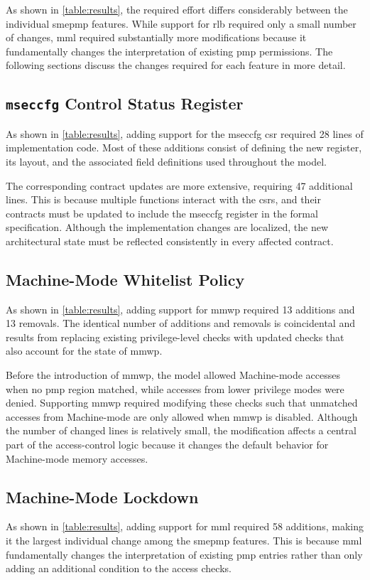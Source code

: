 As shown in \cref{table:results}, the required effort differs considerably between the individual \gls{smepmp} features.
While support for \gls{rlb} required only a small number of changes, \gls{mml} required substantially more modifications because it fundamentally changes the interpretation of existing \gls{pmp} permissions.
The following sections discuss the changes required for each feature in more detail.

\subsection{\texttt{mseccfg} Control Status Register}
As shown in \cref{table:results}, adding support for the mseccfg \gls{csr} required 28 lines of implementation code.
Most of these additions consist of defining the new register, its layout, and the associated field definitions used throughout the model.

The corresponding contract updates are more extensive, requiring 47 additional lines.
This is because multiple functions interact with the \glspl{csr}, and their contracts must be updated to include the mseccfg register in the formal specification.
Although the implementation changes are localized, the new architectural state must be reflected consistently in every affected contract.

\subsection{Machine-Mode Whitelist Policy}
As shown in \cref{table:results}, adding support for \gls{mmwp} required 13 additions and 13 removals.
The identical number of additions and removals is coincidental and results from replacing existing privilege-level checks with updated checks that also account for the state of \gls{mmwp}.

Before the introduction of \gls{mmwp}, the model allowed Machine-mode accesses when no \gls{pmp} region matched, while accesses from lower privilege modes were denied.
Supporting \gls{mmwp} required modifying these checks such that unmatched accesses from Machine-mode are only allowed when \gls{mmwp} is disabled.
Although the number of changed lines is relatively small, the modification affects a central part of the access-control logic because it changes the default behavior for Machine-mode memory accesses.

\subsection{Machine-Mode Lockdown}
As shown in \cref{table:results}, adding support for \gls{mml} required 58 additions, making it the largest individual change among the \gls{smepmp} features.
This is because \gls{mml} fundamentally changes the interpretation of existing \gls{pmp} entries rather than only adding an additional condition to the access checks.

